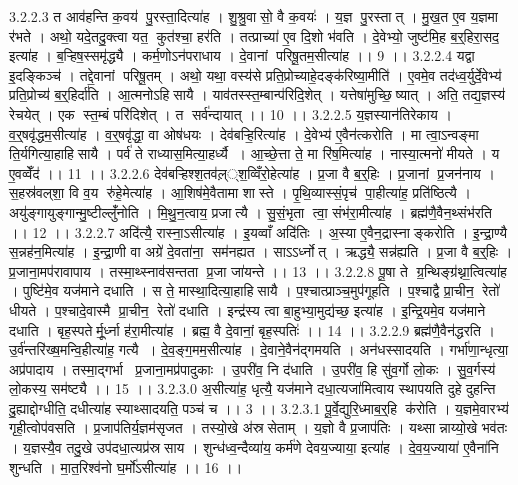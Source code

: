 3.2.2.3
त आव॑हन्ति क॒वय॑ पु॒रस्ता॒दित्या॑ह । शु॒श्रु॒वासो॒ वै क॒वयः॑ । य॒ज्ञ पु॒रस्तात् । मु॒ख॒त ए॒व य॒ज्ञमा र॑भते । अथो॒ यदे॒तदु॒क्त्वा यत॒ कुत॑श्चा॒ हर॑ति । तत्प्राच्या॑ ए॒व दि॒शो भ॑वति । दे॒वेभ्यो॒ जुष्ट॑मि॒ह ब॒र्॒हिरा॒सद॒ इत्या॑ह । ब॒ऱ्हिष॒स्समृ॑द्ध्यै । कर्म॒णोऽन॑पराधाय । दे॒वानां परिषू॒तम॒सीत्या॑ह ।। 9 ।।
3.2.2.4
यद्वा इ॒दङ्किञ्च॑ । तद्दे॒वानां परिषू॒तम् । अथो॒ यथा॒ वस्य॑से प्रति॒प्रोच्याहे॒दङ्क॑रिष्या॒मीति॑ । ए॒वमे॒व तद॑ध्व॒र्युर्दे॒वेभ्य॑ प्रति॒प्रोच्य॑ ब॒र्॒हिर्दा॑ति । आ॒त्मनोऽहि॑सायै । याव॑तस्स्त॒म्बान्प॑रिदि॒शेत् । यत्तेषा॑मुच्छि॒॒ष्यात् । अति॒ तद्य॒ज्ञस्य॑ रेचयेत् । एक॑ स्त॒म्बं परि॑दिशेत् । त सर्व॑न्दायात् ।। 10 ।।
3.2.2.5
य॒ज्ञस्यान॑तिरेकाय । व॒र्॒षवृ॑द्धम॒सीत्या॑ह । व॒र्॒षवृ॑द्धा॒ वा ओष॑धयः । देव॑बऱ्हि॒रित्या॑ह । दे॒वेभ्य॑ ए॒वैन॑त्करोति । मा त्वा॒ऽन्वङ्मा ति॒र्यगित्या॒हाहि॑सायै । पर्व॑ ते राध्यास॒मित्या॒हर्ध्यै । आ॒च्छे॒त्ता ते॒ मा रि॑ष॒मित्या॑ह । नास्या॒त्मनो॑ मीयते । य ए॒वव्वेँद॑ ।। 11 ।।
3.2.2.6
देव॑बऱ्हिश्श॒तव॑ल़््श॒व्विँरो॒हेत्या॑ह । प्र॒जा वै ब॒र्॒हिः । प्र॒जानां प्र॒जन॑नाय । स॒हस्र॑वल्‌शा॒ वि व॒य रु॑हे॒मेत्या॑ह । आ॒शिष॑मे॒वैतामा शास्ते । पृ॒थि॒व्यास्सं॒पृच॑ पा॒हीत्या॑ह॒ प्रति॑ष्ठित्यै । अयु॑ङ्गायुङ्गान्मु॒ष्टील्लुँ॑नोति । मि॒थु॒न॒त्वाय॒ प्रजात्यै । सु॒सं॒भृता त्वा॒ संभ॑रा॒मीत्या॑ह । ब्रह्म॑णै॒वैन॒थ्संभ॑रति ।। 12 ।।
3.2.2.7
अदि॑त्यै॒ रास्ना॒ऽसीत्या॑ह । इ॒यव्वाँ अदि॑तिः । अ॒स्या ए॒वैन॒द्रास्नाङ्करोति । इ॒न्द्रा॒ण्यै स॒न्नह॑न॒मित्या॑ह । इ॒न्द्रा॒णी वा अग्रे॑ दे॒वता॑ना॒॒ सम॑नह्यत । साऽऽर्ध्नोत् । ऋद्ध्यै॒ सन्न॑ह्यति । प्र॒जा वै ब॒र्॒हिः । प्र॒जाना॒मप॑रावापाय । तस्मा॒थ्स्नाव॑सन्तता प्र॒जा जा॑यन्ते ।। 13 ।।
3.2.2.8
पू॒षा ते ग्र॒न्थिङ्ग्र॑थ्ना॒त्वित्या॑ह । पुष्टि॑मे॒व यज॑माने दधाति । स ते॒ मास्था॒दित्या॒हाहि॑सायै । प॒श्चात्प्राञ्च॒मुप॑गूहति । प॒श्चाद्वै प्रा॒चीन॒॒ रेतो॑ धीयते । प॒श्चादे॒वास्मै प्रा॒चीन॒॒ रेतो॑ दधाति । इन्द्र॑स्य त्वा बा॒हुभ्या॒मुद्य॑च्छ॒ इत्या॑ह । इ॒न्द्रि॒यमे॒व यज॑माने दधाति । बृह॒स्पतेर्मू॒र्ध्ना ह॑रा॒मीत्या॑ह । ब्रह्म॒ वै दे॒वानां॒ बृह॒स्पतिः॑ ।। 14 ।।
3.2.2.9
ब्रह्म॑णै॒वैन॑द्धरति । उ॒र्व॑न्तरि॑ख्ष॒मन्वि॒हीत्या॑ह॒ गत्यै । दे॒व॒ङ्ग॒मम॒सीत्या॑ह । दे॒वाने॒वैन॑द्गमयति । अन॑धस्सादयति । गर्भा॑णा॒न्धृत्या॒ अप्र॑पादाय । तस्मा॒द्गर्भा प्र॒जाना॒मप्र॑पादुकाः । उ॒परी॑व॒ नि द॑धाति । उ॒परी॑व॒ हि सु॑व॒र्गो लो॒कः । सु॒व॒र्गस्य॑ लो॒कस्य॒ सम॑ष्ट्यै ।। 15 ।।
3.2.3.0
अ॒सीत्या॑ह॒ धृत्यै॒ यज॑माने दधा॒त्यजा॑मित्वाय स्थापयति दुहे दुहन्ति दु॒ह्याद्दोग्धीति॒ दधीत्या॑ह स्याथ्सादयति॒ पञ्च॑ च ।। 3 ।।
3.2.3.1
पू॒र्वे॒द्युरि॒ध्माब॒र्॒हि क॑रोति । य॒ज्ञमे॒वारभ्य॑ गृही॒त्वोप॑वसति । प्र॒जाप॑तिर्य॒ज्ञम॑सृजत । तस्यो॒खे अ॑स्रसेताम् । य॒ज्ञो वै प्र॒जाप॑तिः । यथ्सान्नाय्यो॒खे भव॑तः । य॒ज्ञस्यै॒व तदु॒खे उप॑दधा॒त्यप्र॑स्रसाय । शुन्ध॑ध्व॒न्दैव्या॑य॒ कर्म॑णे देवय॒ज्याया॒ इत्या॑ह । दे॒व॒य॒ज्याया॑ ए॒वैना॑नि शुन्धति । मा॒त॒रिश्व॑नो घ॒र्मो॑ऽसीत्या॑ह ।। 16 ।।
